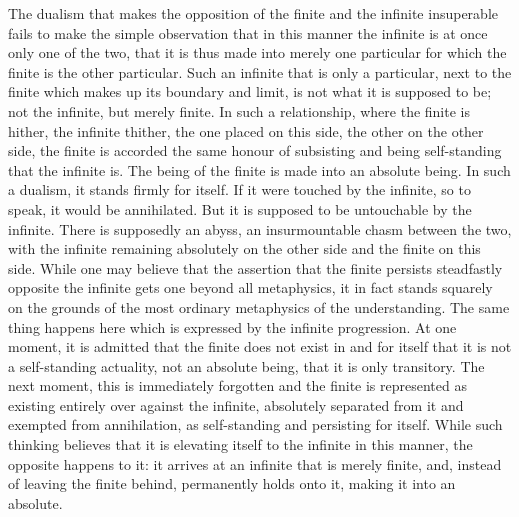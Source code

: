     The dualism that makes the opposition of the finite and the infinite
    insuperable fails to make the simple observation that in this manner
    the infinite is at once only one of the two, that it is thus made into
    merely one particular for which the finite is the other particular.
    Such an infinite that is only a particular, next to the finite which
    makes up its boundary and limit, is not what it is supposed to be;
    not the infinite, but merely finite.
    In such a relationship, where the finite is hither, the infinite thither,
    the one placed on this side, the other on the other side,
    the finite is accorded the same honour of subsisting and
    being self-standing that the infinite is.
    The being of the finite is made into an absolute being.
    In such a dualism, it stands firmly for itself.
    If it were touched by the infinite,
    so to speak, it would be annihilated.
    But it is supposed to be untouchable by the infinite.
    There is supposedly an abyss,
    an insurmountable chasm between the two,
    with the infinite remaining absolutely on the other side
    and the finite on this side.
    While one may believe that the assertion
    that the finite persists steadfastly opposite the infinite
    gets one beyond all metaphysics,
    it in fact stands squarely on the grounds of
    the most ordinary metaphysics of the understanding.
    The same thing happens here which is expressed
    by the infinite progression.
    At one moment, it is admitted that the finite
    does not exist in and for itself
    that it is not a self-standing actuality,
    not an absolute being,
    that it is only transitory.
    The next moment, this is immediately forgotten
    and the finite is represented as existing entirely
    over against the infinite,
    absolutely separated from it
    and exempted from annihilation,
    as self-standing and persisting for itself.
    While such thinking believes that it is elevating itself
    to the infinite in this manner, the opposite happens to it:
    it arrives at an infinite that is merely finite,
    and, instead of leaving the finite behind,
    permanently holds onto it, making it into an absolute.

